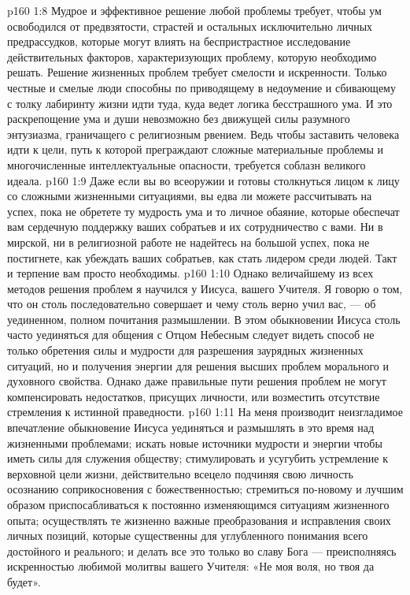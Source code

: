 \vs p160 1:8 Мудрое и эффективное решение любой проблемы требует, чтобы ум освободился от предвзятости, страстей и остальных исключительно личных предрассудков, которые могут влиять на беспристрастное исследование действительных факторов, характеризующих проблему, которую необходимо решать. Решение жизненных проблем требует смелости и искренности. Только честные и смелые люди способны по приводящему в недоумение и сбивающему с толку лабиринту жизни идти туда, куда ведет логика бесстрашного ума. И это раскрепощение ума и души невозможно без движущей силы разумного энтузиазма, граничащего с религиозным рвением. Ведь чтобы заставить человека идти к цели, путь к которой преграждают сложные материальные проблемы и многочисленные интеллектуальные опасности, требуется соблазн великого идеала.
\vs p160 1:9 Даже если вы во всеоружии и готовы столкнуться лицом к лицу со сложными жизненными ситуациями, вы едва ли можете рассчитывать на успех, пока не обретете ту мудрость ума и то личное обаяние, которые обеспечат вам сердечную поддержку ваших собратьев и их сотрудничество с вами. Ни в мирской, ни в религиозной работе не надейтесь на большой успех, пока не постигнете, как убеждать ваших собратьев, как стать лидером среди людей. Такт и терпение вам просто необходимы.
\vs p160 1:10 \pc Однако величайшему из всех методов решения проблем я научился у Иисуса, вашего Учителя. Я говорю о том, что он столь последовательно совершает и чему столь верно учил вас, --- об уединенном, полном почитания размышлении. В этом обыкновении Иисуса столь часто уединяться для общения с Отцом Небесным следует видеть способ не только обретения силы и мудрости для разрешения заурядных жизненных ситуаций, но и получения энергии для решения высших проблем морального и духовного свойства. Однако даже правильные пути решения проблем не могут компенсировать недостатков, присущих личности, или возместить отсутствие стремления к истинной праведности.
\vs p160 1:11 На меня производит неизгладимое впечатление обыкновение Иисуса уединяться и размышлять в это время над жизненными проблемами; искать новые источники мудрости и энергии чтобы иметь силы для служения обществу; стимулировать и усугубить устремление к верховной цели жизни, действительно всецело подчиняя свою личность осознанию соприкосновения с божественностью; стремиться по\hyp{}новому и лучшим образом приспосабливаться к постоянно изменяющимся ситуациям жизненного опыта; осуществлять те жизненно важные преобразования и исправления своих личных позиций, которые существенны для углубленного понимания всего достойного и реального; и делать все это только во славу Бога --- преисполняясь искренностью любимой молитвы вашего Учителя: «Не моя воля, но твоя да будет».
